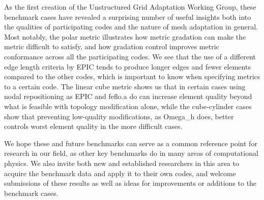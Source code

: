 \documentclass[3p,times,procedia,number]{elsarticle}
\begin{document}
As the first creation of the Unstructured Grid Adaptation Working Group, these benchmark cases have revealed
a surprising number of useful insights both into the qualities of participating codes and the
nature of mesh adaptation in general.
Most notably, the polar metric illustrates how metric gradation can make the metric difficult to satisfy,
and how gradation control improves metric conformance across all the participating codes.
We see that the use of a different edge length criteria by EPIC tends to produce longer edges
and fewer elements compared to the other codes,
which is important to know when specifying metrics to a certain code.
The linear cube metric shows us that in certain cases using nodal repositioning as EPIC and feflo.a do can increase element quality
beyond what is feasible with topology modification alone,
while the cube-cylinder cases show that preventing low-quality modifications, as Omega\_h does, better
controls worst element quality in the more difficult cases.

We hope these and future benchmarks can serve as a common reference point for research in our field,
as other key benchmarks do in many areas of computational physics.
We also invite both new and established researchers in this area to acquire the benchmark data
and apply it to their own codes, and welcome submissions of these results as well
as ideas for improvements or additions to the benchmark cases.



\end{document}
